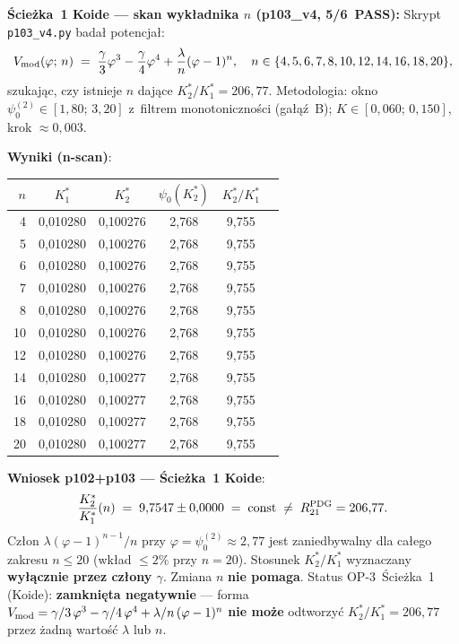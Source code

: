 \begin{remark}
\medskip
\textbf{\'Scie\.zka~1 Koide --- skan wyk\l{}adnika $n$ (p103\_v4, 5/6~PASS):}%
\label{para:p103-n-scan}
Skrypt \texttt{p103\_v4.py}
bada\l{} potencja\l{}:
\begin{equation}\label{eq:Vmod-n}
  V_{\rm mod}(\varphi;\,n)
  \;=\; \frac{\gamma}{3}\varphi^3 - \frac{\gamma}{4}\varphi^4
       + \frac{\lambda}{n}(\varphi-1)^n,
  \quad n \in \{4,5,6,7,8,10,12,14,16,18,20\},
\end{equation}
szukaj\k{a}c, czy istnieje $n$ daj\k{a}ce $K^*_2/K^*_1 = 206{,}77$.
Metodologia: okno $\psi_0^{(2)} \in [1{,}80;\,3{,}20]$ z~filtrem monotoniczno\'sci
(ga\l{}\k{a}\'z~B); $K \in [0{,}060;\,0{,}150]$, krok $\approx 0{,}003$.

\textbf{Wyniki (n-scan)}:
\begin{center}\small
\begin{tabular}{@{}rccccc@{}}
\toprule
$n$ & $K^*_1$ & $K^*_2$ & $\psi_0(K^*_2)$ & $K^*_2/K^*_1$ \\
\midrule
 4 & 0{,}010280 & 0{,}100276 & 2{,}768 & 9{,}755 \\
 5 & 0{,}010280 & 0{,}100276 & 2{,}768 & 9{,}755 \\
 6 & 0{,}010280 & 0{,}100276 & 2{,}768 & 9{,}755 \\
 7 & 0{,}010280 & 0{,}100276 & 2{,}768 & 9{,}755 \\
 8 & 0{,}010280 & 0{,}100276 & 2{,}768 & 9{,}755 \\
10 & 0{,}010280 & 0{,}100276 & 2{,}768 & 9{,}755 \\
12 & 0{,}010280 & 0{,}100276 & 2{,}768 & 9{,}755 \\
14 & 0{,}010280 & 0{,}100277 & 2{,}768 & 9{,}755 \\
16 & 0{,}010280 & 0{,}100277 & 2{,}768 & 9{,}755 \\
18 & 0{,}010280 & 0{,}100277 & 2{,}768 & 9{,}755 \\
20 & 0{,}010280 & 0{,}100277 & 2{,}768 & 9{,}755 \\
\bottomrule
\end{tabular}
\end{center}

\textbf{Wniosek p102+p103 --- \'Scie\.zka~1 Koide}:
\begin{equation}\label{eq:K2K1-n-scan}
  \frac{K^*_2}{K^*_1}(n)
    \;=\; 9{,}7547 \pm 0{,}0000
    \;=\; \mathrm{const}
    \;\neq\; R_{21}^{\rm PDG} = 206{,}77.
\end{equation}
Cz\l{}on $\lambda(\varphi-1)^{n-1}/n$ przy $\varphi = \psi_0^{(2)} \approx 2{,}77$
jest zaniedbywalny dla ca\l{}ego zakresu $n \leq 20$
(wk\l{}ad $\leq 2\%$ przy $n=20$).
Stosunek $K^*_2/K^*_1$ wyznaczany \textbf{wy\l{}\k{a}cznie przez cz\l{}ony $\gamma$}.
Zmiana $n$ \textbf{nie pomaga}.
Status OP-3~\'Scie\.zka~1 (Koide): \textbf{zamkni\k{e}ta negatywnie} ---
forma $V_{\rm mod} = \gamma/3\,\varphi^3 - \gamma/4\,\varphi^4 + \lambda/n\,(\varphi-1)^n$
\textbf{nie mo\.ze} odtworzy\'c $K^*_2/K^*_1 = 206{,}77$ przez \.zadn\k{a} warto\'s\'c $\lambda$ lub $n$.


\end{remark}
